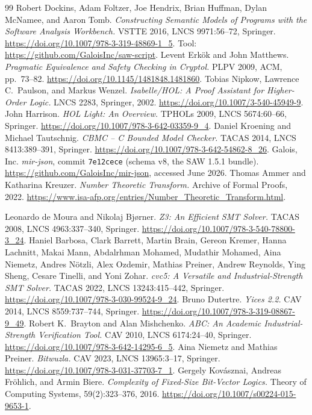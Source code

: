 \documentclass[journal=tches,submission,review]{iacrtrans}
\begin{document}
\begin{thebibliography}{99}
 Robert Dockins, Adam Foltzer, Joe Hendrix, Brian Huffman, Dylan McNamee, and Aaron
  Tomb. \emph{Constructing Semantic Models of Programs with the Software Analysis Workbench.}
  VSTTE 2016, LNCS 9971:56--72, Springer. \url{https://doi.org/10.1007/978-3-319-48869-1_5}.
  Tool: \url{https://github.com/GaloisInc/saw-script}.
 Levent Erk\"ok and John Matthews. \emph{Pragmatic Equivalence and Safety Checking
  in Cryptol.} PLPV 2009, ACM, pp.\ 73--82. \url{https://doi.org/10.1145/1481848.1481860}.
 Tobias Nipkow, Lawrence C.\ Paulson, and Markus Wenzel. \emph{Isabelle/HOL:
  A Proof Assistant for Higher-Order Logic.} LNCS 2283, Springer, 2002.
  \url{https://doi.org/10.1007/3-540-45949-9}.
 John Harrison. \emph{HOL Light: An Overview.} TPHOLs 2009, LNCS 5674:60--66,
  Springer. \url{https://doi.org/10.1007/978-3-642-03359-9_4}.
 Daniel Kroening and Michael Tautschnig. \emph{CBMC -- C Bounded Model Checker.}
  TACAS 2014, LNCS 8413:389--391, Springer. \url{https://doi.org/10.1007/978-3-642-54862-8_26}.
 Galois, Inc. \emph{mir-json}, commit \texttt{7e12cece} (schema v8, the SAW 1.5.1
  bundle). \url{https://github.com/GaloisInc/mir-json}, accessed June 2026.
 Thomas Ammer and Katharina Kreuzer. \emph{Number Theoretic Transform.}
  Archive of Formal Proofs, 2022.
  \url{https://www.isa-afp.org/entries/Number_Theoretic_Transform.html}.

 Leonardo de Moura and Nikolaj Bj\o rner. \emph{Z3: An Efficient SMT Solver.}
  TACAS 2008, LNCS 4963:337--340, Springer. \url{https://doi.org/10.1007/978-3-540-78800-3_24}.
 Haniel Barbosa, Clark Barrett, Martin Brain, Gereon Kremer, Hanna Lachnitt, Makai
  Mann, Abdalrhman Mohamed, Mudathir Mohamed, Aina Niemetz, Andres N\"otzli, Alex Ozdemir, Mathias
  Preiner, Andrew Reynolds, Ying Sheng, Cesare Tinelli, and Yoni Zohar. \emph{cvc5: A Versatile and
  Industrial-Strength SMT Solver.} TACAS 2022, LNCS 13243:415--442, Springer.
  \url{https://doi.org/10.1007/978-3-030-99524-9_24}.
 Bruno Dutertre. \emph{Yices 2.2.} CAV 2014, LNCS 8559:737--744, Springer.
  \url{https://doi.org/10.1007/978-3-319-08867-9_49}.
 Robert K.\ Brayton and Alan Mishchenko. \emph{ABC: An Academic Industrial-Strength
  Verification Tool.} CAV 2010, LNCS 6174:24--40, Springer.
  \url{https://doi.org/10.1007/978-3-642-14295-6_5}.
 Aina Niemetz and Mathias Preiner. \emph{Bitwuzla.} CAV 2023, LNCS 13965:3--17,
  Springer. \url{https://doi.org/10.1007/978-3-031-37703-7_1}.
 Gergely Kov\'asznai, Andreas Fr\"ohlich, and Armin Biere. \emph{Complexity of
  Fixed-Size Bit-Vector Logics.} Theory of Computing Systems, 59(2):323--376, 2016.
  \url{https://doi.org/10.1007/s00224-015-9653-1}.


\end{thebibliography}
\end{document}
